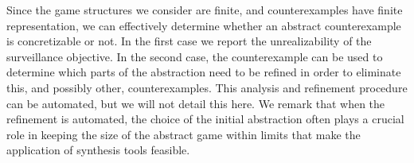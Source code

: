 Since the game structures we consider are finite, and counterexamples have finite representation, we can effectively determine whether an abstract counterexample is concretizable or not. In the first case we report the unrealizability of the surveillance objective. In the second case, the counterexample can be used to determine which parts of the abstraction need to be refined in order to eliminate this, and possibly other, counterexamples. This analysis and refinement procedure can be automated, but we will not detail this here. We remark that when the refinement is automated, the choice of the initial abstraction often plays a crucial role in keeping the size of the abstract game within  limits that make the application of synthesis tools feasible.
